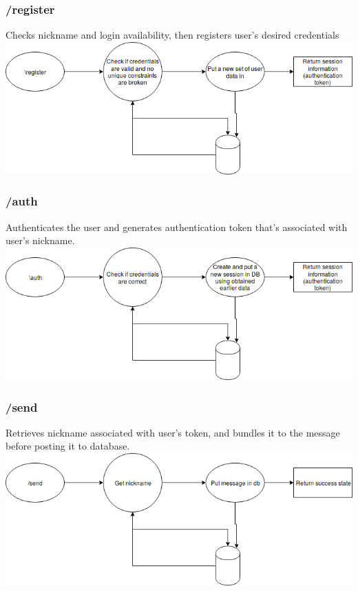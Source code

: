 \documentclass[12pt]{article}
\begin{document}
	\subsubsection{/register}
	Checks nickname and login availability, then registers user's desired credentials\\
	\includegraphics[width=\linewidth]{registerDiagram.png}
	\subsubsection{/auth}
	Authenticates the user and generates authentication token that's associated with user's nickname.\\
	\includegraphics[width=\linewidth]{authDiagram.png}
	\subsubsection{/send}
	Retrieves nickname associated with user's token, and bundles it to the message before posting it to database.\\
	\includegraphics[width=\textwidth]{sendDiagram.png}
\end{document}
